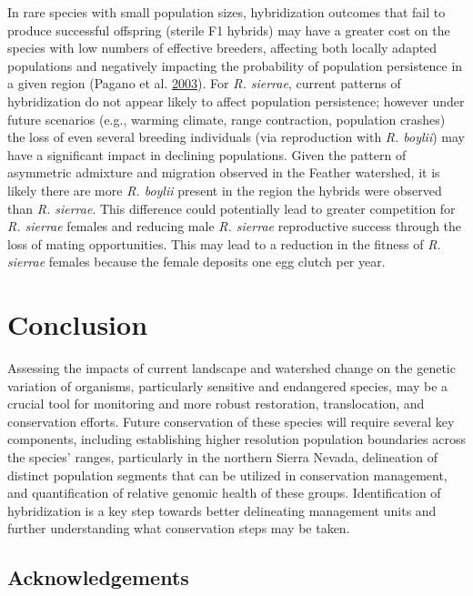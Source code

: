 \documentclass[proquest,12pt,final]{ucthesis-CA2012} %
\begin{document}
\begin{ucmainmatter}
In rare species with small population sizes, hybridization outcomes that
fail to produce successful offspring (sterile F1 hybrids) may have a
greater cost on the species with low numbers of effective breeders,
affecting both locally adapted populations and negatively impacting the
probability of population persistence in a given region (Pagano et al.
\protect\hyperlink{ref-pagano_frog_2003}{2003}). For \emph{R. sierrae},
current patterns of hybridization do not appear likely to affect
population persistence; however under future scenarios (e.g., warming
climate, range contraction, population crashes) the loss of even several
breeding individuals (via reproduction with \emph{R. boylii}) may have a
significant impact in declining populations. Given the pattern of
asymmetric admixture and migration observed in the Feather watershed, it
is likely there are more \emph{R. boylii} present in the region the
hybrids were observed than \emph{R. sierrae}. This difference could
potentially lead to greater competition for \emph{R. sierrae} females
and reducing male \emph{R. sierrae} reproductive success through the
loss of mating opportunities. This may lead to a reduction in the
fitness of \emph{R. sierrae} females because the female deposits one egg
clutch per year.

\hypertarget{conclusion-1}{%
\section{Conclusion}\label{conclusion-1}}

Assessing the impacts of current landscape and watershed change on the
genetic variation of organisms, particularly sensitive and endangered
species, may be a crucial tool for monitoring and more robust
restoration, translocation, and conservation efforts. Future
conservation of these species will require several key components,
including establishing higher resolution population boundaries across
the species' ranges, particularly in the northern Sierra Nevada,
delineation of distinct population segments that can be utilized in
conservation management, and quantification of relative genomic health
of these groups. Identification of hybridization is a key step towards
better delineating management units and further understanding what
conservation steps may be taken.

\hypertarget{acknowledgements}{%
\subsection{Acknowledgements}\label{acknowledgements}}


\end{ucmainmatter}
\end{document}
